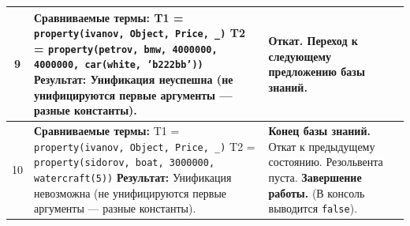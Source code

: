 \begin{tabularx}{\textwidth}{|c|X|X|}
	9                                                                                                   &
	\textbf{Сравниваемые термы:} \newline
	T1 = \texttt{property(ivanov, Object, Price, \_)} \newline
	T2 = \texttt{property(petrov, bmw, 4000000, 4000000, car(white, 'b222bb'))} \newline
	\textbf{Результат:} Унификация неуспешна (не унифицируются первые аргументы --- разные константы).  &
	\textbf{Откат.} Переход к следующему предложению базы знаний.                                                                                                                                                  \\
	\hline

	10                                                                                                  &
	\textbf{Сравниваемые термы:} \newline
	T1 = \texttt{property(ivanov, Object, Price, \_)} \newline
	T2 = \texttt{property(sidorov, boat, 3000000, watercraft(5))} \newline
	\textbf{Результат:} Унификация невозможна (не унифицируются первые аргументы --- разные константы). &
	\textbf{Конец базы знаний.} Откат к предыдущему состоянию. \newline
	Резольвента пуста. \newline
	\textbf{Завершение работы.} (В консоль выводится \texttt{false}).                                                                                                                                              \\
	\hline
\end{tabularx}
